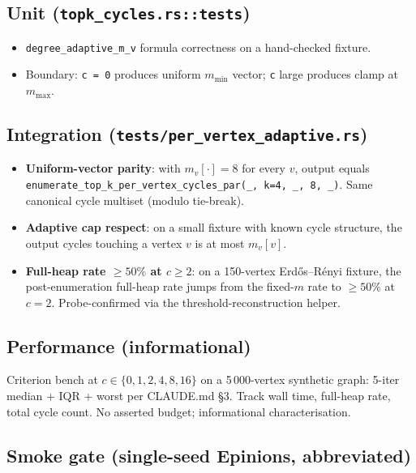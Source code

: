 \documentclass[a4paper,11pt]{article}
\begin{document}
\subsection*{Unit (\texttt{topk\_cycles.rs::tests})}

\begin{itemize}
  \item \texttt{degree\_adaptive\_m\_v} formula correctness on a
    hand-checked fixture.
  \item Boundary: \texttt{c = 0} produces uniform $m_\text{min}$
    vector; \texttt{c} large produces clamp at $m_\text{max}$.
\end{itemize}

\subsection*{Integration (\texttt{tests/per\_vertex\_adaptive.rs})}

\begin{itemize}
  \item \textbf{Uniform-vector parity}: with $m_v[\cdot] = 8$ for
    every $v$, output equals
    \texttt{enumerate\_top\_k\_per\_vertex\_cycles\_par(\_, k=4,
    \_, 8, \_)}.  Same canonical cycle multiset (modulo tie-break).
  \item \textbf{Adaptive cap respect}: on a small fixture with
    known cycle structure, the output cycles touching a vertex $v$
    is at most $m_v[v]$.
  \item \textbf{Full-heap rate $\ge 50\%$ at $c \ge 2$}: on a
    150-vertex Erdős--Rényi fixture, the post-enumeration full-heap
    rate jumps from the fixed-$m$ rate to $\ge 50\%$ at $c=2$.
    Probe-confirmed via the threshold-reconstruction helper.
\end{itemize}

\subsection*{Performance (informational)}

Criterion bench at $c \in \{0, 1, 2, 4, 8, 16\}$ on a
5\,000-vertex synthetic graph: 5-iter median + IQR + worst per
CLAUDE.md \S3.  Track wall time, full-heap rate, total cycle count.
No asserted budget; informational characterisation.

\subsection*{Smoke gate (single-seed Epinions, abbreviated)}
\end{document}
